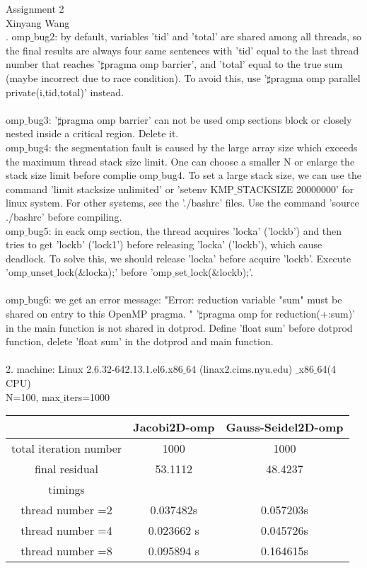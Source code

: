 \documentclass{article}
\begin{document}
{\centering
{\LARGE{Assignment 2}}\\
\vspace{0.5cm}
Xinyang Wang\\}
\vspace{0.5cm}
. omp$\_$bug2: by default, variables 'tid' and 'total' are shared among all threads, so the final results are always four same sentences with 'tid' equal to the last thread number that reaches '$\sharp$pragma omp barrier', and 'total' equal to the true sum (maybe incorrect due to race condition).
To avoid this, use '$\sharp$pragma omp parallel private(i,tid,total)' instead.\\
\\omp$\_$bug3: '$\sharp$pragma omp barrier' can not be used omp sections block or closely nested inside a critical region. Delete it.
\\omp$\_$bug4: the segmentation fault is caused by the large array size which exceeds the maximum thread stack size limit. One can choose a smaller N or enlarge the stack size limit before complie omp$\_$bug4. To set a large stack size, we can use the command 'limit stacksize unlimited' or 'setenv KMP$\_$STACKSIZE 20000000' for linux system. For other systems, see the './bashrc' files. Use the command 'source ./bashrc' before compiling. 
\\omp$\_$bug5: in eack omp section, the thread acquires 'locka' ('lockb') and then tries to get 'lockb' ('lock1') before releasing 'locka' ('lockb'), which cause deadlock. To solve this, we should release 'locka' before acquire 'lockb'. Execute 'omp$\_$unset$\_$lock($\&$locka);'  before 'omp$\_$set$\_$lock($\&$lockb);'.\\
\\omp$\_$bug6: we get an error message: "Error: reduction variable "sum" must be shared on entry to this OpenMP pragma. "  '$\sharp$pragma omp for reduction(+:sum)' in the main function is not shared in dotprod. Define 'float sum' before dotprod function, delete 'float sum' in the dotprod and main function.\\
\\2. 
machine: Linux 2.6.32-642.13.1.el6.x86$\_$64 (linax2.cims.nyu.edu) $\_$x86$\_$64(4 CPU)\\
N=100, max$\_$iters=1000
\begin{table}[H]
\begin{tabular}{|c|c|c|}
\hline
&Jacobi2D-omp & Gauss-Seidel2D-omp\\
\hline
total iteration number& 1000& 1000\\
\hline
final residual &53.1112& 48.4237\\
\hline
timings & &\\
 thread number =2&    0.037482s & 0.057203s \\
           thread number =4& 0.023662 s& 0.045726s \\
           thread number =8& 0.095894 s & 0.164615s\\
\hline
\end{tabular}
\end{table}
\end{document}
